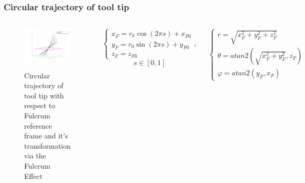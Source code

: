 \begin{frame}
\frametitle{Circular trajectory of tool tip}

\begin{columns}
\begin{center}
\begin{figure}[!htb]
\centering
\includegraphics[width=\textwidth]{../images/rcm_trajectories/rcm_circle_traj.png}\\
\caption{Circular trajectory of tool tip with respect to Fulcrum reference frame and it's transformation via the Fulcrum Effect}
\end{figure}
\end{center}

\[
\begin{cases}
x^{}_{F} = r_0\cos(2πs) + x^{}_{F0} \\
y^{}_{F} = r_0\sin(2πs) + y^{}_{F0} \\
z^{}_{F} = z^{}_{F0}
\end{cases} ,
\]
\[
s \in [0, 1]
\]

\[
\begin{cases}
r = \sqrt{x^{2}_{F} + y^{2}_{F} + z^{2}_{F}} \\
θ = atan2 \left( \sqrt{x^{2}_{F} + y^{2}_{F}}, z^{}_{F} \right) \\
φ = atan2(y^{}_{F}, x^{}_{F})
\end{cases}
\]
\end{columns}
\end{frame}


